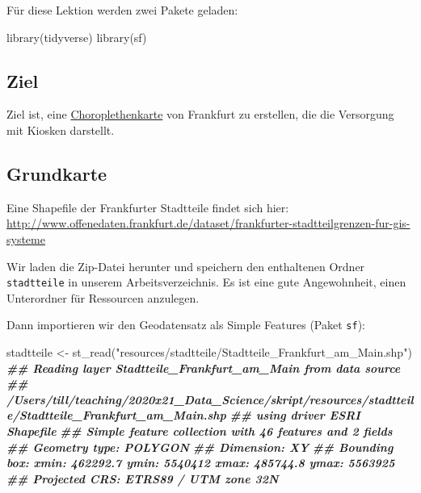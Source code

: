 \documentclass[
  ngerman,
]{article}
\newenvironment{Shaded}{\begin{snugshade}}{\end{snugshade}}
\newcommand{\DocumentationTok}[1]{\textcolor[rgb]{0.56,0.35,0.01}{\textbf{\textit{#1}}}}
\newcommand{\FunctionTok}[1]{\textcolor[rgb]{0.00,0.00,0.00}{#1}}
\newcommand{\NormalTok}[1]{#1}
\newcommand{\OtherTok}[1]{\textcolor[rgb]{0.56,0.35,0.01}{#1}}
\newcommand{\StringTok}[1]{\textcolor[rgb]{0.31,0.60,0.02}{#1}}
\begin{document}
Für diese Lektion werden zwei Pakete geladen:

\begin{Shaded}
\begin{Highlighting}[]
\FunctionTok{library}\NormalTok{(tidyverse)}
\FunctionTok{library}\NormalTok{(sf)}
\end{Highlighting}
\end{Shaded}

\hypertarget{ziel}{%
\subsection{Ziel}\label{ziel}}

Ziel ist, eine \href{https://de.wikipedia.org/wiki/Choroplethenkarte}{Choroplethenkarte} von Frankfurt zu erstellen, die die Versorgung mit Kiosken darstellt.

\hypertarget{grundkarte}{%
\subsection{Grundkarte}\label{grundkarte}}

Eine Shapefile der Frankfurter Stadtteile findet sich hier: \url{http://www.offenedaten.frankfurt.de/dataset/frankfurter-stadtteilgrenzen-fur-gis-systeme}

Wir laden die Zip-Datei herunter und speichern den enthaltenen Ordner \texttt{stadtteile} in unserem Arbeitsverzeichnis. Es ist eine gute Angewohnheit, einen Unterordner für Ressourcen anzulegen.

Dann importieren wir den Geodatensatz als Simple Features (Paket \texttt{sf}):

\begin{Shaded}
\begin{Highlighting}[]
\NormalTok{stadtteile }\OtherTok{\textless{}{-}} \FunctionTok{st\_read}\NormalTok{(}\StringTok{"resources/stadtteile/Stadtteile\_Frankfurt\_am\_Main.shp"}\NormalTok{)}
\DocumentationTok{\#\# Reading layer \textasciigrave{}Stadtteile\_Frankfurt\_am\_Main\textquotesingle{} from data source }
\DocumentationTok{\#\#   \textasciigrave{}/Users/till/teaching/2020x21\_Data\_Science/skript/resources/stadtteile/Stadtteile\_Frankfurt\_am\_Main.shp\textquotesingle{} }
\DocumentationTok{\#\#   using driver \textasciigrave{}ESRI Shapefile\textquotesingle{}}
\DocumentationTok{\#\# Simple feature collection with 46 features and 2 fields}
\DocumentationTok{\#\# Geometry type: POLYGON}
\DocumentationTok{\#\# Dimension:     XY}
\DocumentationTok{\#\# Bounding box:  xmin: 462292.7 ymin: 5540412 xmax: 485744.8 ymax: 5563925}
\DocumentationTok{\#\# Projected CRS: ETRS89 / UTM zone 32N}
\end{Highlighting}
\end{Shaded}
\end{document}
